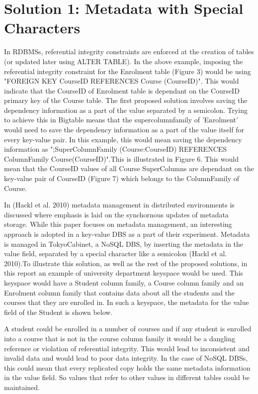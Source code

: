 \section{Solution 1:  Metadata with Special Characters}\label{s:sol1}

In RDBMSs, referential integrity constraints are enforced at the creation of
tables (or updated later using ALTER TABLE). In the above example, imposing the
referential integrity constraint for the Enrolment table (Figure 3) would be
using "FOREIGN KEY CourseID REFERENCES Course (CourseID)". This would indicate
that the CourseID of Enrolment table is dependant on the CourseID primary key of
the Course table.
The first proposed solution involves saving the dependency information as a part
of the value separated by a semicolon. Trying to achieve this in Bigtable means
that the supercolumnfamily of 'Enrolment' would need to save the dependency
information as a part of the value itself for every key-value pair. In this
example, this would mean saving the dependency information as 
";SuperColumnFamily (Course:CourseID) REFERENCES ColumnFamily
Course(CourseID)".This is illustrated in Figure 6. This would mean that the
CourseID values of all Course SuperColumns are dependant on the key-value pair
of CourseID (Figure 7) which belongs to the ColumnFamily of Course.

In (Hackl et al. 2010) metadata management in distributed environments is
discussed where emphasis is laid on the synchornous updates of metadata storage.
While this paper focuses on metadata management, an interesting approach is
adopted in a key-value DBS as a part of their experiment. Metadata is managed in
TokyoCabinet, a NoSQL DBS, by inserting the metadata in the value field,
separated by a special character like a semicolon (Hackl et al. 2010).To
illustrate this solution, as well as the rest of the proposed solutions, in this
report an example of university department keyspace would be used. This keyspace
would have a Student column family, a Course column family and an Enrolment
column family that contains data about all the students and the courses that
they are enrolled in. In such a keyspace, the metadata for the value field of
the Student is shown below.

A student could be enrolled in a number of courses and if any student is
enrolled into a course that is not in the course column family it would be a
dangling reference or violation of referential integrity. This would lead to
inconsistent and invalid data and would lead to poor data integrity.
In the case of NoSQL DBSs, this could mean that every replicated copy holds the
same metadata information in the value field. So values that refer to other
values in different tables could be maintained.

